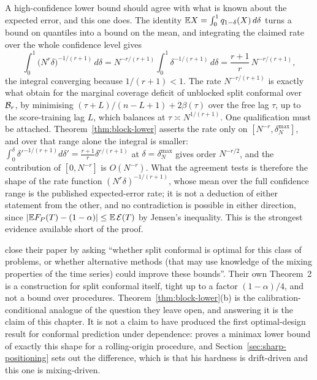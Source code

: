 \documentclass[../../../main.tex]{subfiles}
\begin{document}
\begin{remark}\label{rem:sharp-bp-check}
A high-confidence lower bound should agree with what is known about the expected error, and this one does. The identity $\mathbb{E} X=\int_0^1q_{1-\delta}(X)\,d\delta$ turns a bound on quantiles into a bound on the mean, and integrating the claimed rate over the whole confidence level gives
\[
\int_0^1\big(N^r\delta\big)^{-1/(r+1)}\,d\delta
= N^{-r/(r+1)}\int_0^1\delta^{-1/(r+1)}\,d\delta
= \frac{r+1}r\,N^{-r/(r+1)} ,
\]
the integral converging because $1/(r+1)<1$. The rate $N^{-r/(r+1)}$ is exactly what \citet[Cor.~1, eq.~(6)]{barber2026} obtain for the marginal coverage deficit of unblocked split conformal over $\mathcal B_{r}$, by minimising $(\tau+L)/(n-L+1)+2\beta(\tau)$ over the free lag $\tau$, up to the score-training lag $L$, which balances at $\tau\asymp N^{1/(r+1)}$. One qualification must be attached. Theorem~\ref{thm:block-lower} asserts the rate only on $[N^{-r},\delta^{\max}_N]$, and over that range alone the integral is smaller: $\int_0^\delta\delta'^{-1/(r+1)}d\delta'=\frac{r+1}r\delta^{r/(r+1)}$ at $\delta=\delta^{\max}_N$ gives order $N^{-r/2}$, and the contribution of $[0,N^{-r}]$ is $O(N^{-r})$. What the agreement tests is therefore the shape of the rate function $(N^r\delta)^{-1/(r+1)}$, whose mean over the full confidence range is the published expected-error rate; it is not a deduction of either statement from the other, and no contradiction is possible in either direction, since $|\mathbb{E} F_P(T)-(1-\alpha)|\le\mathbb{E}\,\mathcal E(T)$ by Jensen's inequality. This is the strongest evidence available short of the proof.
\end{remark}

\begin{remark}\label{rem:sharp-open}
\citet[Sec.~4]{barber2026} close their paper by asking ``whether split conformal is optimal for this class of problems, or whether alternative methods (that may use knowledge of the mixing properties of the time series) could improve these bounds''. Their own Theorem~2 is a construction for split conformal itself, tight up to a factor $(1-\alpha)/4$, and not a bound over procedures. Theorem~\ref{thm:block-lower}(b) is the calibration-conditional analogue of the question they leave open, and answering it is the claim of this chapter. It is not a claim to have produced the first optimal-design result for conformal prediction under dependence: \citet[Thm.~4]{halkiewicz2026} proves a minimax lower bound of exactly this shape for a rolling-origin procedure, and Section~\ref{sec:sharp-positioning} sets out the difference, which is that his hardness is drift-driven and this one is mixing-driven.
\end{remark}
\end{document}
